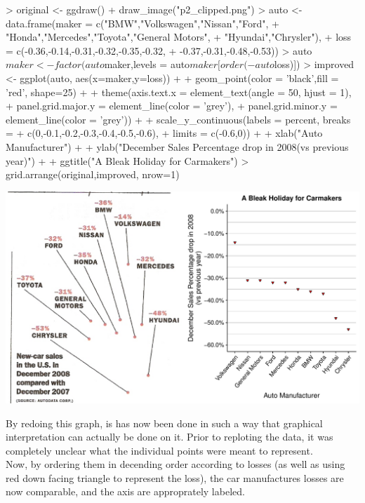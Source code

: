 \documentclass[12pt,letterpaper,final]{article}
\begin{document}
\begin{enumerate}
\begin{Schunk}
\begin{Sinput}
> original <- ggdraw() + draw_image("p2_clipped.png")
> auto <- data.frame(maker = c("BMW","Volkswagen","Nissan","Ford",
+                              "Honda","Mercedes","Toyota","General Motors",
+                              "Hyundai","Chrysler"),
+                    loss = c(-0.36,-0.14,-0.31,-0.32,-0.35,-0.32,
+                             -0.37,-0.31,-0.48,-0.53))
> auto$maker <- factor(auto$maker,levels = auto$maker[order(-auto$loss)])
> improved <- ggplot(auto, aes(x=maker,y=loss)) + 
+   geom_point(color = 'black',fill = 'red', shape=25) + 
+   theme(axis.text.x = element_text(angle = 50, hjust = 1), 
+         panel.grid.major.y = element_line(color = 'grey'), 
+         panel.grid.minor.y = element_line(color = 'grey')) +
+   scale_y_continuous(labels = percent, breaks = 
+                        c(0,-0.1,-0.2,-0.3,-0.4,-0.5,-0.6), 
+                      limits = c(-0.6,0)) + 
+   xlab("Auto Manufacturer") + 
+   ylab("December Sales Percentage drop in 2008\n(vs previous year)") + 
+   ggtitle("A Bleak Holiday for Carmakers")
> grid.arrange(original,improved, nrow=1)
\end{Sinput}
\end{Schunk}
\includegraphics{hw03_bartschi-002}

By redoing this graph, is has now been done in such a way that graphical interpretation can actually be done on it.  Prior to reploting the data, it was completely unclear what the individual points were meant to represent.  \\

Now, by ordering them in decending order according to losses (as well as using red down facing triangle to represent the loss), the car manufactures losses are now comparable, and the axis are approprately labeled.
\newpage



\end{enumerate}
\end{document}
